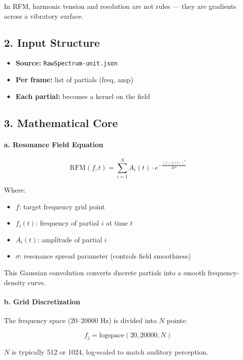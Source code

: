 \documentclass{article}
\begin{document}
In RFM, harmonic tension and resolution are not rules — they are gradients across a vibratory surface.

\subsection*{2. Input Structure}

\begin{itemize}
    \item \textbf{Source:} \texttt{RawSpectrum-unit.json}
    \item \textbf{Per frame:} list of partials (freq, amp)
    \item \textbf{Each partial:} becomes a kernel on the field
\end{itemize}

\subsection*{3. Mathematical Core}

\paragraph{a. Resonance Field Equation}

\[
\text{RFM}(f, t) = \sum_{i=1}^N A_i(t) \cdot e^{-\frac{(f - f_i(t))^2}{2\sigma^2}}
\]

Where:

\begin{itemize}
    \item $f$: target frequency grid point
    \item $f_i(t)$: frequency of partial $i$ at time $t$
    \item $A_i(t)$: amplitude of partial $i$
    \item $\sigma$: resonance spread parameter (controls field smoothness)
\end{itemize}

This Gaussian convolution converts discrete partials into a smooth frequency-density curve.

\paragraph{b. Grid Discretization}

The frequency space (20–20000 Hz) is divided into $N$ points:

\[
f_j = \text{logspace}(20, 20000, N)
\]

$N$ is typically 512 or 1024, log-scaled to match auditory perception.
\end{document}
